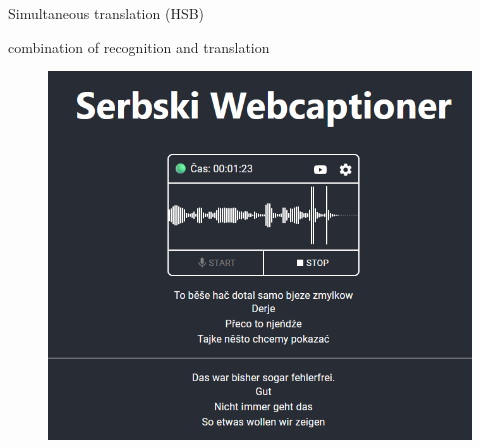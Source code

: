   \begin{block}{Simultaneous translation (HSB)}

    combination of recognition and translation

    \begin{figure}
        \centering
        \includegraphics[width=0.8\colwidth]{webcaptioner_klein.png}
        \label{fig:webcaptioner}
    \end{figure}

  \end{block}
